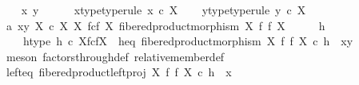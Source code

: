 \begin{isabellebody}
\ \ \isamarkupfalse%
\ x\ y\ \ \isanewline
\ \ \isamarkupfalse%
\ x{\isacharunderscore}{\kern0pt}type{\isacharbrackleft}{\kern0pt}type{\isacharunderscore}{\kern0pt}rule{\isacharbrackright}{\kern0pt}{\isacharcolon}{\kern0pt}\ {\isachardoublequoteopen}x\ {\isasymin}\isactrlsub c\ X{\isachardoublequoteclose}\isanewline
\ \ \isamarkupfalse%
\ y{\isacharunderscore}{\kern0pt}type{\isacharbrackleft}{\kern0pt}type{\isacharunderscore}{\kern0pt}rule{\isacharbrackright}{\kern0pt}{\isacharcolon}{\kern0pt}\ {\isachardoublequoteopen}y\ {\isasymin}\isactrlsub c\ X{\isachardoublequoteclose}\isanewline
\ \ \isamarkupfalse%
\ a{}{\isacharcolon}{\kern0pt}\ {\isachardoublequoteopen}{\isasymlangle}x{\isacharcomma}{\kern0pt}y{\isasymrangle}\ {\isasymin}\isactrlbsub X\ {\isasymtimes}\isactrlsub c\ X\isactrlesub \ {\isacharparenleft}{\kern0pt}X\ \isactrlbsub f\isactrlesub {\isasymtimes}\isactrlsub c\isactrlbsub f\isactrlesub \ X{\isacharcomma}{\kern0pt}\ fibered{\isacharunderscore}{\kern0pt}product{\isacharunderscore}{\kern0pt}morphism\ X\ f\ f\ X{\isacharparenright}{\kern0pt}{\isachardoublequoteclose}\isanewline
\ \ \isamarkupfalse%
\ \isamarkupfalse%
\ h\ \isanewline
\ \ \ \ h{\isacharunderscore}{\kern0pt}type{\isacharcolon}{\kern0pt}\ {\isachardoublequoteopen}h\ {\isasymin}\isactrlsub c\ X\isactrlbsub f\isactrlesub {\isasymtimes}\isactrlsub c\isactrlbsub f\isactrlesub X{\isachardoublequoteclose}\ \ h{\isacharunderscore}{\kern0pt}eq{\isacharcolon}{\kern0pt}\ {\isachardoublequoteopen}fibered{\isacharunderscore}{\kern0pt}product{\isacharunderscore}{\kern0pt}morphism\ X\ f\ f\ X\ {\isasymcirc}\isactrlsub c\ h\ {\isacharequal}{\kern0pt}\ {\isasymlangle}x{\isacharcomma}{\kern0pt}y{\isasymrangle}{\isachardoublequoteclose}\isanewline
\ \ \ \ \isamarkupfalse%
\ {\isacharparenleft}{\kern0pt}meson\ factors{\isacharunderscore}{\kern0pt}through{\isacharunderscore}{\kern0pt}def{}\ relative{\isacharunderscore}{\kern0pt}member{\isacharunderscore}{\kern0pt}def{}{\isacharparenright}{\kern0pt}\isanewline
\isanewline
\ \ \isamarkupfalse%
\ left{\isacharunderscore}{\kern0pt}eq{\isacharcolon}{\kern0pt}\ {\isachardoublequoteopen}fibered{\isacharunderscore}{\kern0pt}product{\isacharunderscore}{\kern0pt}left{\isacharunderscore}{\kern0pt}proj\ X\ f\ f\ X\ {\isasymcirc}\isactrlsub c\ h\ {\isacharequal}{\kern0pt}\ x{\isachardoublequoteclose}\isanewline
\ \ \ \ \ \ \isamarkupfalse%

\end{isabellebody}
